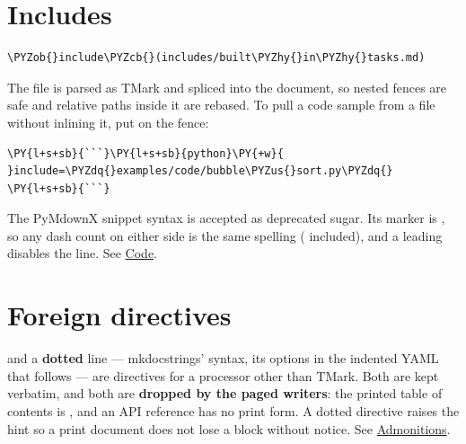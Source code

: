 \documentclass[a4paper,twoside]{article}
\begin{document}
\section{Includes}
\begin{tscode}[lang=md, engine=pygments]
\begin{Verbatim}[commandchars=\\\{\},breaklines, breakanywhere, commandchars=\\\{\}]
\PYZob{}include\PYZcb{}(includes/built\PYZhy{}in\PYZhy{}tasks.md)
\end{Verbatim}
\end{tscode}
The file is parsed as TMark and spliced into the document, so nested fences are
safe and relative paths inside it are rebased. To pull a code sample from a
file without inlining it, put  on the fence:
\begin{tscode}[lang=md, engine=pygments]
\begin{Verbatim}[commandchars=\\\{\},breaklines, breakanywhere, commandchars=\\\{\}]
\PY{l+s+sb}{```}\PY{l+s+sb}{python}\PY{+w}{ }include=\PYZdq{}examples/code/bubble\PYZus{}sort.py\PYZdq{}
\PY{l+s+sb}{```}
\end{Verbatim}
\end{tscode}
The PyMdownX snippet syntax  is accepted as deprecated sugar.
Its marker is , so any dash count on either side is the same
spelling ( included), and a leading \tscodeinline{;} disables the line. See
\href{code.md\#external-sources}{Code}.
\section{Foreign directives}
\tscodeinline{[TOC]} and a \textbf{dotted}  line --- mkdocstrings' syntax, its
options in the indented YAML that follows --- are directives for a processor
other than TMark. Both are kept verbatim, and both are \textbf{dropped by the paged
writers}: the printed table of contents is , and an API reference
has no print form. A dotted directive raises the hint  so a
print document does not lose a block without notice. See
\href{admonitions.md\#foreign-directives}{Admonitions}.
\end{document}
